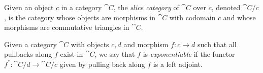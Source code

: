 \documentclass[Book-Poly]{subfiles}
\begin{document}
\begin{definition} \label{def.slice}
Given an object $c$ in a category $\cat{C}$, the \emph{slice category} of $\cat{C}$ over $c$, denoted $\cat{C}/c$, is the category whose objects are morphisms in $\cat{C}$ with codomain $c$ and whose morphisms are commutative triangles in $\cat{C}$.
\end{definition}

\begin{definition}
Given a category $\cat{C}$ with objects $c, d$ and morphism $f \colon c \to d$ such that all pullbacks along $f$ exist in $\cat{C}$, we say that $f$ is \emph{exponentiable} if the functor $f^* \colon \cat{C}/d \to \cat{C}/c$ given by pulling back along $f$ is a left adjoint.
\end{definition}
\end{document}
